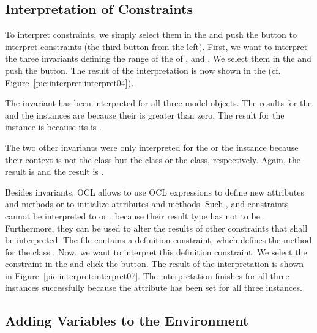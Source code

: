 \subsection{Interpretation of Constraints}

To interpret constraints, we simply select them in the  
and push the button to interpret constraints (the third button from the left). 
First, we want to interpret the three invariants defining the range of the 
 of ,  and . We 
select them in the  and push the  button.
The result of the interpretation is now shown in the  (cf. Figure~\ref{pic:interpret:interpret04}).

The invariant  has been interpreted for all three model objects.
The results for the  and the  instances are 
 because their  is greater than zero. The result for the
 instance is  because its  is 
.

The two other invariants were only interpreted for the  or the 
 instance because their context is not the class 
 but the  class or the  class, 
respectively. Again, the  result is  and the 
 result is .

Besides invariants, \acs{OCL} allows to use \acs{OCL} expressions to
define new attributes and methods or to initialize attributes and methods. Such
,  and  constraints cannot be interpreted to
 or , because their result type has not to be 
. Furthermore, they can be used to alter the results of other 
constraints that shall be interpreted. The  file 
contains a definition constraint, which defines the method  for 
the class . Now, we want to interpret this definition constraint. 
We select the constraint in the  and click the
 button. The result of the interpretation is shown in 
Figure~\ref{pic:interpret:interpret07}. The interpretation finishes for all
three instances successfully because the attribute  has been set for 
all three instances.


\subsection{Adding Variables to the Environment}

